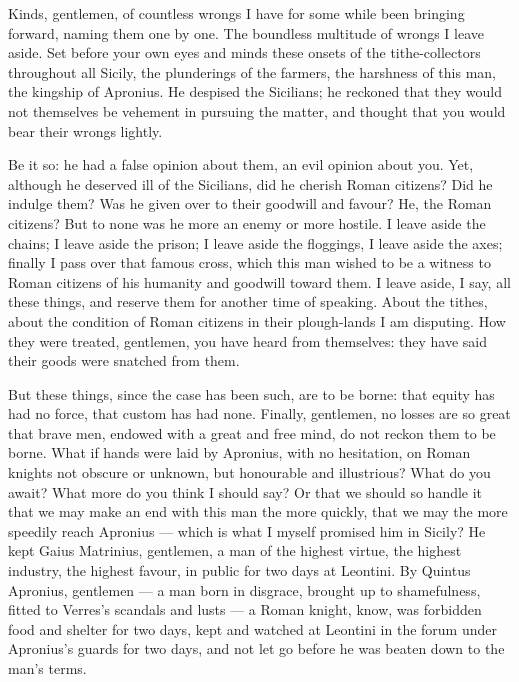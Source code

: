  Kinds, gentlemen, of countless wrongs I have for some while been bringing forward, naming them one by one. The boundless multitude of wrongs I leave aside. Set before your own eyes and minds these onsets of the tithe-collectors throughout all Sicily, the plunderings of the farmers, the harshness of this man, the kingship of Apronius. He despised the Sicilians; he reckoned that they would not themselves be vehement in pursuing the matter, and thought that you would bear their wrongs lightly.

 Be it so: he had a false opinion about them, an evil opinion about you. Yet, although he deserved ill of the Sicilians, did he cherish Roman citizens? Did he indulge them? Was he given over to their goodwill and favour? He, the Roman citizens? But to none was he more an enemy or more hostile. I leave aside the chains; I leave aside the prison; I leave aside the floggings, I leave aside the axes; finally I pass over that famous cross, which this man wished to be a witness to Roman citizens of his humanity and goodwill toward them. I leave aside, I say, all these things, and reserve them for another time of speaking. About the tithes, about the condition of Roman citizens in their plough-lands I am disputing. How they were treated, gentlemen, you have heard from themselves: they have said their goods were snatched from them.

 But these things, since the case has been such, are to be borne: that equity has had no force, that custom has had none. Finally, gentlemen, no losses are so great that brave men, endowed with a great and free mind, do not reckon them to be borne. What if hands were laid by Apronius, with no hesitation, on Roman knights not obscure or unknown, but honourable and illustrious? What do you await? What more do you think I should say? Or that we should so handle it that we may make an end with this man the more quickly, that we may the more speedily reach Apronius --- which is what I myself promised him in Sicily? He kept Gaius Matrinius, gentlemen, a man of the highest virtue, the highest industry, the highest favour, in public for two days at Leontini. By Quintus Apronius, gentlemen --- a man born in disgrace, brought up to shamefulness, fitted to Verres's scandals and lusts --- a Roman knight, know, was forbidden food and shelter for two days, kept and watched at Leontini in the forum under Apronius's guards for two days, and not let go before he was beaten down to the man's terms.

